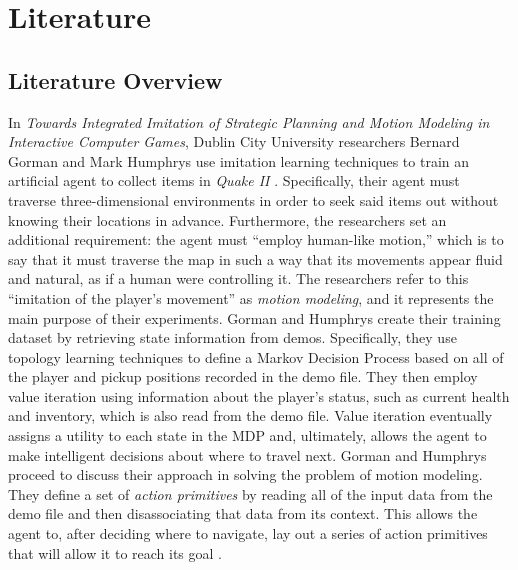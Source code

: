 \chapter{Literature}
\label{ch:Literature}



\section{Literature Overview}

In {\it Towards Integrated Imitation of Strategic Planning and Motion Modeling in Interactive Computer Games}, Dublin City University researchers Bernard Gorman and Mark Humphrys use imitation learning techniques to train an artificial agent to collect items in {\it Quake II} \cite{Gorman:2006}. Specifically, their agent must traverse three-dimensional environments in order to seek said items out without knowing their locations in advance. Furthermore, the researchers set an additional requirement: the agent must ``employ human-like motion,'' which is to say that it must traverse the map in such a way that its movements appear fluid and natural, as if a human were controlling it. The researchers refer to this ``imitation of the player's movement'' as {\it motion modeling}, and it represents the main purpose of their experiments. Gorman and Humphrys create their training dataset by retrieving state information from demos. Specifically, they use topology learning techniques to define a Markov Decision Process based on all of the player and pickup positions recorded in the demo file. They then employ value iteration using information about the player's status, such as current health and inventory, which is also read from the demo file. Value iteration eventually assigns a utility to each state in the MDP and, ultimately, allows the agent to make intelligent decisions about where to travel next. Gorman and Humphrys proceed to discuss their approach in solving the problem of motion modeling. They define a set of {\it action primitives} by reading all of the input data from the demo file and then disassociating that data from its context. This allows the agent to, after deciding where to navigate, lay out a series of action primitives that will allow it to reach its goal \cite{Gorman:2006}.

